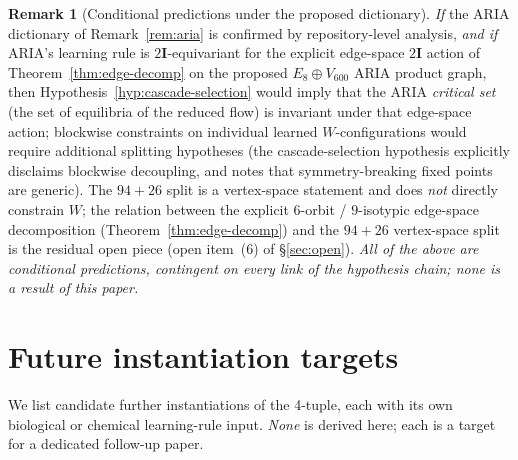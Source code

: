 \documentclass[11pt]{article}
\theoremstyle{definition}
\newtheorem{remark}[theorem]{Remark}
\newcommand{\twoI}{2\mathbf{I}}
\begin{document}
\begin{remark}[Conditional predictions under the proposed dictionary]
\emph{If} the ARIA dictionary of Remark~\ref{rem:aria} is confirmed by repository-level analysis, \emph{and if} ARIA's learning rule is $\twoI$-equivariant for the explicit edge-space $\twoI$ action of Theorem~\ref{thm:edge-decomp} on the proposed $E_8\oplus V_{600}$ ARIA product graph, then Hypothesis~\ref{hyp:cascade-selection} would imply that the ARIA \emph{critical set} (the set of equilibria of the reduced flow) is invariant under that edge-space action; blockwise constraints on individual learned $W$-configurations would require additional splitting hypotheses (the cascade-selection hypothesis explicitly disclaims blockwise decoupling, and notes that symmetry-breaking fixed points are generic). The $94 + 26$ split is a vertex-space statement and does \emph{not} directly constrain $W$; the relation between the explicit $6$-orbit / $9$-isotypic edge-space decomposition (Theorem~\ref{thm:edge-decomp}) and the $94 + 26$ vertex-space split is the residual open piece (open item~(6) of \S\ref{sec:open}). \emph{All of the above are conditional predictions, contingent on every link of the hypothesis chain; none is a result of this paper.}
\end{remark}

\section{Future instantiation targets}\label{sec:applications}

\noindent{}

\medskip
We list candidate further instantiations of the 4-tuple, each with its own biological or chemical learning-rule input. \emph{None} is derived here; each is a target for a dedicated follow-up paper.
\end{document}
